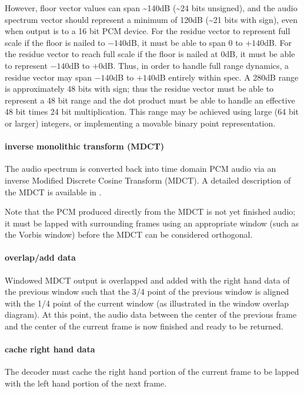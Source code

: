 However, floor vector values can span \~{}140dB (\~{}24 bits unsigned), and
the audio spectrum vector should represent a minimum of 120dB (\~{}21
bits with sign), even when output is to a 16 bit PCM device.  For the
residue vector to represent full scale if the floor is nailed to
$-140$dB, it must be able to span 0 to $+140$dB.  For the residue vector
to reach full scale if the floor is nailed at 0dB, it must be able to
represent $-140$dB to $+0$dB.  Thus, in order to handle full range
dynamics, a residue vector may span $-140$dB to $+140$dB entirely within
spec.  A 280dB range is approximately 48 bits with sign; thus the
residue vector must be able to represent a 48 bit range and the dot
product must be able to handle an effective 48 bit times 24 bit
multiplication.  This range may be achieved using large (64 bit or
larger) integers, or implementing a movable binary point
representation.



\paragraph{inverse monolithic transform (MDCT)}

The audio spectrum is converted back into time domain PCM audio via an
inverse Modified Discrete Cosine Transform (MDCT).  A detailed
description of the MDCT is available in \cite{Sporer/Brandenburg/Edler}.

Note that the PCM produced directly from the MDCT is not yet finished
audio; it must be lapped with surrounding frames using an appropriate
window (such as the Vorbis window) before the MDCT can be considered
orthogonal.



\paragraph{overlap/add data}
Windowed MDCT output is overlapped and added with the right hand data
of the previous window such that the 3/4 point of the previous window
is aligned with the 1/4 point of the current window (as illustrated in
the window overlap diagram). At this point, the audio data between the
center of the previous frame and the center of the current frame is
now finished and ready to be returned.


\paragraph{cache right hand data}
The decoder must cache the right hand portion of the current frame to
be lapped with the left hand portion of the next frame.



